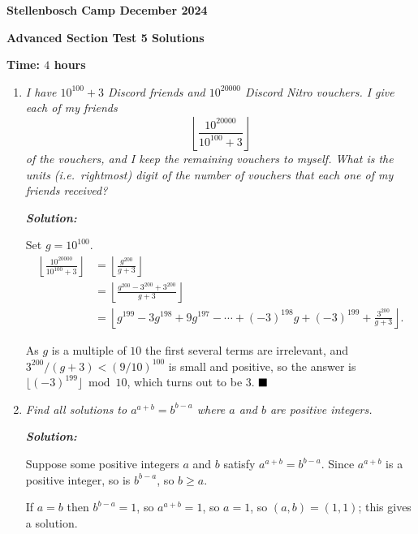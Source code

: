 \documentclass[12pt]{article}
\newcommand{\sol}{\textbf{\textit{Solution: }}}
\begin{document}
\begin{center} \large
\textbf{Stellenbosch Camp December 2024}

\textbf{Advanced Section Test 5 Solutions}

\textbf{Time: \(4\) hours}
\end{center}

\begin{enumerate}[topsep=2\bigskipamount,itemsep=\bigskipamount]
\item \textit{I have $10^{100}+3$ Discord friends and $10^{20000}$ Discord Nitro vouchers.
I give each of my friends
\[\left\lfloor\frac{10^{20000}}{10^{100} + 3}\right\rfloor\] of the vouchers, and I keep the remaining vouchers to myself.
What is the units (i.e.~rightmost) digit of the number of vouchers that each one of my friends received?}

\sol

Set $g = 10^{100}$.
\begin{align*}
\left\lfloor\frac{10^{20000}}{10^{100} + 3}\right\rfloor & = \left\lfloor\frac{g^{200}}{g + 3}\right\rfloor\\ 
& = \left\lfloor\frac{g^{200} - 3^{200} + 3^{200}}{g + 3}\right\rfloor\\
& = \left\lfloor g^{199} - 3g^{198} + 9g^{197} - \cdots + (-3)^{198}g + (-3)^{199} + \frac{3^{200}}{g + 3}\right\rfloor{}. 
\end{align*}

As $g$ is a multiple of $10$ the first several terms are irrelevant, and $3^{200}/(g + 3) < (9/10)^{100}$ is small and positive, so the answer is $\lfloor(-3)^{199}\rfloor \bmod 10$, which turns out to be $3$. $\hfill\blacksquare$

\item \textit{Find all solutions to $a^{a+b} = b^{b-a}$ where $a$ and $b$ are positive integers.}

\sol

Suppose some positive integers $a$ and $b$ satisfy $a^{a+b} = b^{b-a}$. Since $a^{a+b}$ is a positive integer, so is $b^{b-a}$, so $b \geqslant a$.

If $a = b$ then $b^{b-a} = 1$, so $a^{a+b} = 1$, so $a = 1$, so $(a, b) = (1, 1)$; this gives a solution.


\end{enumerate}
\end{document}
